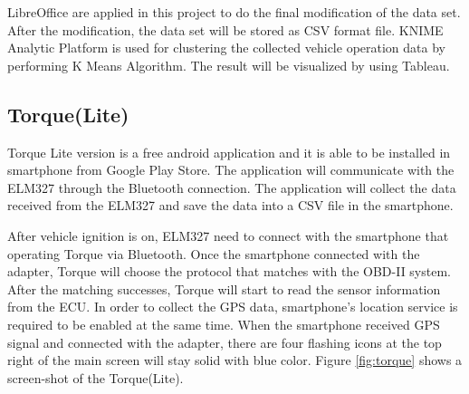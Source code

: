 LibreOffice are applied in this project to do the final modification of the data set. After the modification, the data set will be stored as CSV format file. KNIME Analytic Platform is used for clustering the collected vehicle operation data by performing K Means Algorithm. The result will be visualized by using Tableau.

\subsection{Torque(Lite)}
Torque Lite version is a free android application and it is able to be installed in smartphone from Google Play Store. The application will communicate with the ELM327 through the Bluetooth connection. The application will collect the data received from the ELM327 and  save the data into a CSV file in the smartphone. 

After vehicle ignition is on, ELM327 need to connect with the smartphone that operating Torque via Bluetooth. Once the smartphone connected with the adapter, Torque will choose the protocol that matches with the OBD-II system. After the matching successes, Torque will start to read the sensor information from the ECU. In order to collect the GPS data, smartphone's location service is required to be enabled at the same time. When the smartphone received GPS signal and connected with the adapter, there are four flashing icons at the top right of the main screen will stay solid with blue color. Figure \ref{fig:torque} shows a screen-shot of the Torque(Lite).

